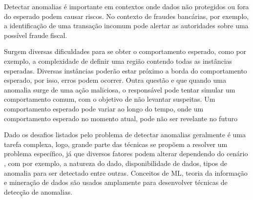 Detectar anomalias é importante em contextos onde dados não protegidos ou fora do esperado podem causar riscos. No contexto de fraudes bancárias, por exemplo, a identificação de uma transação incomum pode alertar as autoridades sobre uma possível fraude fiscal.


Surgem diversas dificuldades para se obter o comportamento esperado, como por exemplo, a complexidade de definir uma região contendo todas as instâncias esperadas. Diversas instâncias poderão estar próximo a borda do comportamento esperado, por isso, erros podem ocorrer. Outra questão e que quando uma anomalia surge de uma ação maliciosa, o responsável pode tentar simular um comportamento comum, com o objetivo de não levantar suspeitas. Um comportamento esperado pode variar ao longo do tempo, onde um comportamento esperado no momento atual, pode não ser revelante no futuro

Dado os desafios listados pelo problema de detectar anomalias geralmente é uma tarefa complexa, logo, grande parte das técnicas se propõem a resolver um problema específico, já que diversos fatores podem alterar dependendo do cenário \cite{Chandola2009}, com por exemplo, a natureza do dado, disponibilidade de dados, tipos de anomalia para ser detectado entre outras. Conceitos de ML, teoria da informação e mineração de dados são usados amplamente para desenvolver técnicas de detecção de anomalias.

